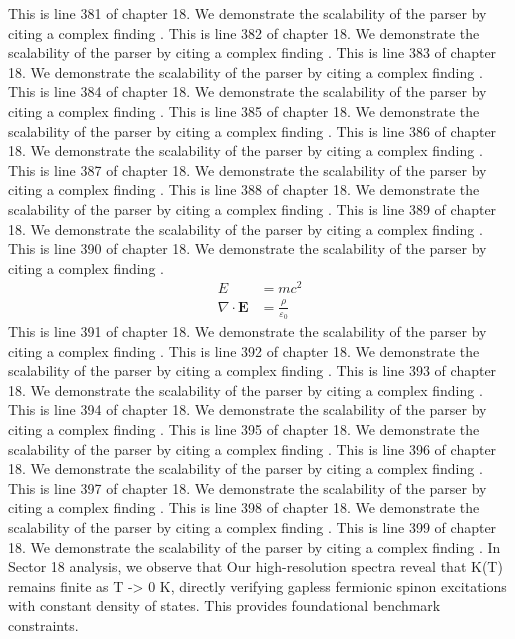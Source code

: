 This is line 381 of chapter 18. We demonstrate the scalability of the parser by citing a complex finding \cite{ref18_381}.
This is line 382 of chapter 18. We demonstrate the scalability of the parser by citing a complex finding \cite{ref18_382}.
This is line 383 of chapter 18. We demonstrate the scalability of the parser by citing a complex finding \cite{ref18_383}.
This is line 384 of chapter 18. We demonstrate the scalability of the parser by citing a complex finding \cite{ref18_384}.
This is line 385 of chapter 18. We demonstrate the scalability of the parser by citing a complex finding \cite{ref18_385}.
This is line 386 of chapter 18. We demonstrate the scalability of the parser by citing a complex finding \cite{ref18_386}.
This is line 387 of chapter 18. We demonstrate the scalability of the parser by citing a complex finding \cite{ref18_387}.
This is line 388 of chapter 18. We demonstrate the scalability of the parser by citing a complex finding \cite{ref18_388}.
This is line 389 of chapter 18. We demonstrate the scalability of the parser by citing a complex finding \cite{ref18_389}.
This is line 390 of chapter 18. We demonstrate the scalability of the parser by citing a complex finding \cite{ref18_390}.
\begin{align*}
  E &= mc^2 \\
  \nabla \cdot \mathbf{E} &= \frac{\rho}{\varepsilon_0}
\end{align*}
This is line 391 of chapter 18. We demonstrate the scalability of the parser by citing a complex finding \cite{ref18_391}.
This is line 392 of chapter 18. We demonstrate the scalability of the parser by citing a complex finding \cite{ref18_392}.
This is line 393 of chapter 18. We demonstrate the scalability of the parser by citing a complex finding \cite{ref18_393}.
This is line 394 of chapter 18. We demonstrate the scalability of the parser by citing a complex finding \cite{ref18_394}.
This is line 395 of chapter 18. We demonstrate the scalability of the parser by citing a complex finding \cite{ref18_395}.
This is line 396 of chapter 18. We demonstrate the scalability of the parser by citing a complex finding \cite{ref18_396}.
This is line 397 of chapter 18. We demonstrate the scalability of the parser by citing a complex finding \cite{ref18_397}.
This is line 398 of chapter 18. We demonstrate the scalability of the parser by citing a complex finding \cite{ref18_398}.
This is line 399 of chapter 18. We demonstrate the scalability of the parser by citing a complex finding \cite{ref18_399}.
In Sector 18 analysis, we observe that Our high-resolution spectra reveal that K(T) remains finite as T -> 0 K, directly verifying gapless fermionic spinon excitations with constant density of states. This provides foundational benchmark constraints.
